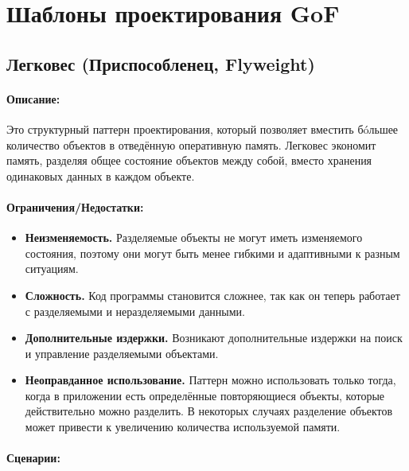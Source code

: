 \documentclass[12pt,onecolumn]{article}
\newcommand{\nparagraph}[1]{\paragraph{#1}\mbox{}\\}
\begin{document}
\section{Шаблоны проектирования GoF}
\subsection{Легковес (Приспособленец, Flyweight)}
\paragraph{Описание:}
Это структурный паттерн проектирования, который позволяет вместить бóльшее количество объектов в отведённую оперативную память. Легковес экономит память, разделяя общее состояние объектов между собой, вместо хранения одинаковых данных в каждом объекте.
\paragraph{Ограничения/Недостатки:}
\begin{itemize}
  \item \textbf{Неизменяемость.} Разделяемые объекты не могут иметь изменяемого состояния, поэтому они могут быть менее гибкими и адаптивными к разным ситуациям.
  \item \textbf{Сложность.} Код программы становится сложнее, так как он теперь работает с разделяемыми и неразделяемыми данными.
  \item \textbf{Дополнительные издержки.} Возникают дополнительные издержки на поиск и управление разделяемыми объектами.
  \item \textbf{Неоправданное использование.} Паттерн можно использовать только тогда, когда в приложении есть определённые повторяющиеся объекты, которые действительно можно разделить. В некоторых случаях разделение объектов может привести к увеличению количества используемой памяти.
\end{itemize}
\nparagraph{Сценарии:}
\end{document}
